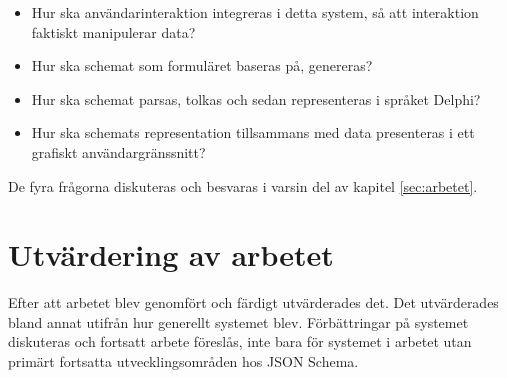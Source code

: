 \begin{itemize}
	\item Hur ska användarinteraktion integreras i detta system, så att interaktion faktiskt manipulerar data?
	\item Hur ska schemat som formuläret baseras på, genereras?
	\item Hur ska schemat parsas, tolkas och sedan representeras i språket Delphi?
	\item Hur ska schemats representation tillsammans med data presenteras i ett grafiskt användargränssnitt?
\end{itemize}

De fyra frågorna diskuteras och besvaras i varsin del av kapitel \ref{sec:arbetet}.

\section{Utvärdering av arbetet}
Efter att arbetet blev genomfört och färdigt utvärderades det. Det utvärderades bland annat utifrån hur generellt systemet blev. Förbättringar på systemet diskuteras och fortsatt arbete föreslås, inte bara för systemet i arbetet utan primärt fortsatta utvecklingsområden hos JSON Schema.